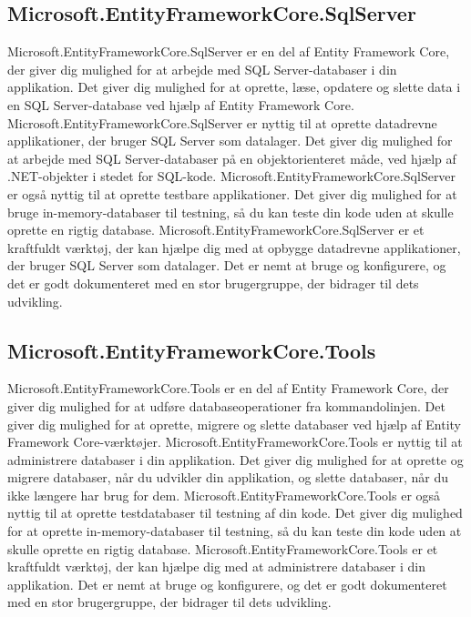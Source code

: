 \subsection{Microsoft.EntityFrameworkCore.SqlServer}
Microsoft.EntityFrameworkCore.SqlServer er en del af Entity Framework Core, der giver dig mulighed for at arbejde med SQL Server-databaser i din applikation. Det giver dig mulighed for at oprette, læse, opdatere og slette data i en SQL Server-database ved hjælp af Entity Framework Core.
Microsoft.EntityFrameworkCore.SqlServer er nyttig til at oprette datadrevne applikationer, der bruger SQL Server som datalager. Det giver dig mulighed for at arbejde med SQL Server-databaser på en objektorienteret måde, ved hjælp af .NET-objekter i stedet for SQL-kode.
Microsoft.EntityFrameworkCore.SqlServer er også nyttig til at oprette testbare applikationer. Det giver dig mulighed for at bruge in-memory-databaser til testning, så du kan teste din kode uden at skulle oprette en rigtig database.
Microsoft.EntityFrameworkCore.SqlServer er et kraftfuldt værktøj, der kan hjælpe dig med at opbygge datadrevne applikationer, der bruger SQL Server som datalager. Det er nemt at bruge og konfigurere, og det er godt dokumenteret med en stor brugergruppe, der bidrager til dets udvikling.

\subsection{Microsoft.EntityFrameworkCore.Tools}
Microsoft.EntityFrameworkCore.Tools er en del af Entity Framework Core, der giver dig mulighed for at udføre databaseoperationer fra kommandolinjen. Det giver dig mulighed for at oprette, migrere og slette databaser ved hjælp af Entity Framework Core-værktøjer.
Microsoft.EntityFrameworkCore.Tools er nyttig til at administrere databaser i din applikation. Det giver dig mulighed for at oprette og migrere databaser, når du udvikler din applikation, og slette databaser, når du ikke længere har brug for dem.
Microsoft.EntityFrameworkCore.Tools er også nyttig til at oprette testdatabaser til testning af din kode. Det giver dig mulighed for at oprette in-memory-databaser til testning, så du kan teste din kode uden at skulle oprette en rigtig database.
Microsoft.EntityFrameworkCore.Tools er et kraftfuldt værktøj, der kan hjælpe dig med at administrere databaser i din applikation. Det er nemt at bruge og konfigurere, og det er godt dokumenteret med en stor brugergruppe, der bidrager til dets udvikling.

